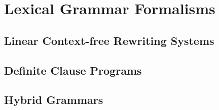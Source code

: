 \documentclass[../document.tex]{subfiles}
\begin{document}
    \chapter{Lexical Grammar Formalisms}
    \section{Linear Context-free Rewriting Systems}
    \section{Definite Clause Programs}
    \section{Hybrid Grammars}
\end{document}
